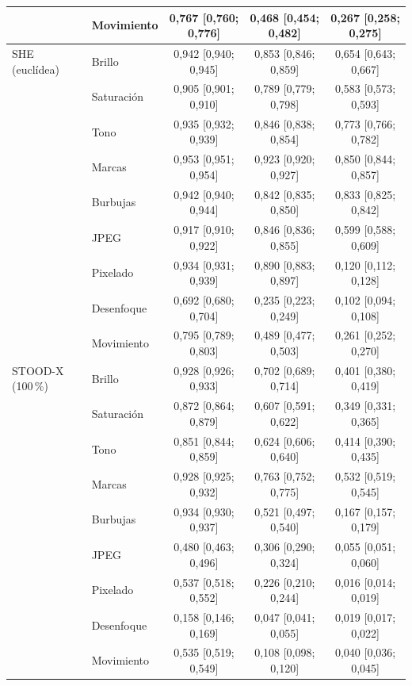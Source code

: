 {\begin{longtable}{llccc}
 & Movimiento & 0{,}767 [0{,}760; 0{,}776] & 0{,}468 [0{,}454; 0{,}482] & 0{,}267 [0{,}258; 0{,}275] \\
\midrule
SHE (euclídea) & Brillo & 0{,}942 [0{,}940; 0{,}945] & 0{,}853 [0{,}846; 0{,}859] & 0{,}654 [0{,}643; 0{,}667] \\
 & Saturación & 0{,}905 [0{,}901; 0{,}910] & 0{,}789 [0{,}779; 0{,}798] & 0{,}583 [0{,}573; 0{,}593] \\
 & Tono & 0{,}935 [0{,}932; 0{,}939] & 0{,}846 [0{,}838; 0{,}854] & 0{,}773 [0{,}766; 0{,}782] \\
 & Marcas & 0{,}953 [0{,}951; 0{,}954] & 0{,}923 [0{,}920; 0{,}927] & 0{,}850 [0{,}844; 0{,}857] \\
 & Burbujas & 0{,}942 [0{,}940; 0{,}944] & 0{,}842 [0{,}835; 0{,}850] & 0{,}833 [0{,}825; 0{,}842] \\
 & JPEG & 0{,}917 [0{,}910; 0{,}922] & 0{,}846 [0{,}836; 0{,}855] & 0{,}599 [0{,}588; 0{,}609] \\
 & Pixelado & 0{,}934 [0{,}931; 0{,}939] & 0{,}890 [0{,}883; 0{,}897] & 0{,}120 [0{,}112; 0{,}128] \\
 & Desenfoque & 0{,}692 [0{,}680; 0{,}704] & 0{,}235 [0{,}223; 0{,}249] & 0{,}102 [0{,}094; 0{,}108] \\
 & Movimiento & 0{,}795 [0{,}789; 0{,}803] & 0{,}489 [0{,}477; 0{,}503] & 0{,}261 [0{,}252; 0{,}270] \\
\midrule
STOOD-X (100\,\%) & Brillo & 0{,}928 [0{,}926; 0{,}933] & 0{,}702 [0{,}689; 0{,}714] & 0{,}401 [0{,}380; 0{,}419] \\
 & Saturación & 0{,}872 [0{,}864; 0{,}879] & 0{,}607 [0{,}591; 0{,}622] & 0{,}349 [0{,}331; 0{,}365] \\
 & Tono & 0{,}851 [0{,}844; 0{,}859] & 0{,}624 [0{,}606; 0{,}640] & 0{,}414 [0{,}390; 0{,}435] \\
 & Marcas & 0{,}928 [0{,}925; 0{,}932] & 0{,}763 [0{,}752; 0{,}775] & 0{,}532 [0{,}519; 0{,}545] \\
 & Burbujas & 0{,}934 [0{,}930; 0{,}937] & 0{,}521 [0{,}497; 0{,}540] & 0{,}167 [0{,}157; 0{,}179] \\
 & JPEG & 0{,}480 [0{,}463; 0{,}496] & 0{,}306 [0{,}290; 0{,}324] & 0{,}055 [0{,}051; 0{,}060] \\
 & Pixelado & 0{,}537 [0{,}518; 0{,}552] & 0{,}226 [0{,}210; 0{,}244] & 0{,}016 [0{,}014; 0{,}019] \\
 & Desenfoque & 0{,}158 [0{,}146; 0{,}169] & 0{,}047 [0{,}041; 0{,}055] & 0{,}019 [0{,}017; 0{,}022] \\
 & Movimiento & 0{,}535 [0{,}519; 0{,}549] & 0{,}108 [0{,}098; 0{,}120] & 0{,}040 [0{,}036; 0{,}045] \\

\end{longtable}}
